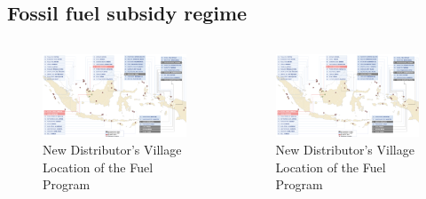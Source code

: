 \documentclass[
11pt,notheorems,compress,hyperref={pdfauthor=Maghfira Ramadhani}
]{beamer}
\begin{document}
\subsection{Fossil fuel subsidy regime}
\begin{frame}
    \begin{columns}[T,onlytextwidth]
      \begin{figure}[t]
        \includegraphics[scale=0.4]{Final_Project/image/BBM Satu Harga.png}
        \caption{New Distributor's Village Location of the Fuel Program}
        \label{f:graph3}
        \end{figure}

        \begin{figure}[t]
        \includegraphics[scale=0.4]{Final_Project/image/BBM Satu Harga.png}
        \caption{New Distributor's Village Location of the Fuel Program}
        \label{f:graph3}
        \end{figure}
    \end{columns}
\end{frame}
\end{document}

